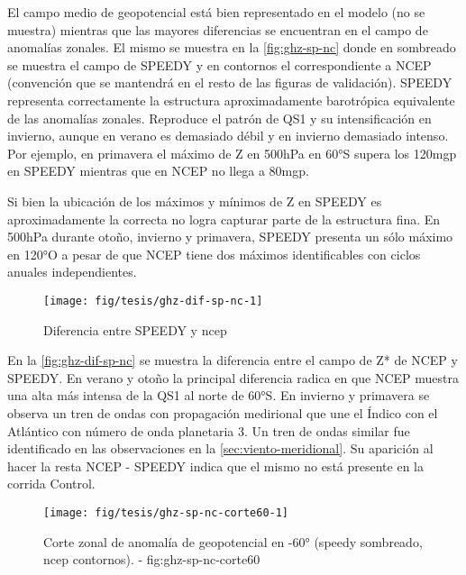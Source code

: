 \documentclass[spanish,a4paper,12p]{book}
\begin{document}
El campo medio de geopotencial está bien representado en el modelo (no
se muestra) mientras que las mayores diferencias se encuentran en el
campo de anomalías zonales. El mismo se muestra en la
\autoref{fig:ghz-sp-nc} donde en sombreado se muestra el campo de SPEEDY
y en contornos el correspondiente a NCEP (convención que se mantendrá en
el resto de las figuras de validación). SPEEDY representa correctamente
la estructura aproximadamente barotrópica equivalente de las anomalías
zonales. Reproduce el patrón de QS1 y su intensificación en invierno,
aunque en verano es demasiado débil y en invierno demasiado intenso. Por
ejemplo, en primavera el máximo de Z en 500hPa en 60°S supera los 120mgp
en SPEEDY mientras que en NCEP no llega a 80mgp.

Si bien la ubicación de los máximos y mínimos de Z en SPEEDY es
aproximadamente la correcta no logra capturar parte de la estructura
fina. En 500hPa durante otoño, invierno y primavera, SPEEDY presenta un
sólo máximo en 120°O a pesar de que NCEP tiene dos máximos
identificables con ciclos anuales independientes.

\begin{landscape}\begin{figure}

{\centering \texttt{[image: fig/tesis/ghz-dif-sp-nc-1]} 

}

\caption{Diferencia entre SPEEDY y ncep}\label{fig:ghz-dif-sp-nc}
\end{figure}
\end{landscape}

En la \autoref{fig:ghz-dif-sp-nc} se muestra la diferencia entre el
campo de Z* de NCEP y SPEEDY. En verano y otoño la principal diferencia
radica en que NCEP muestra una alta más intensa de la QS1 al norte de
60°S. En invierno y primavera se observa un tren de ondas con
propagación medirional que une el Índico con el Atlántico con número de
onda planetaria 3. Un tren de ondas similar fue identificado en las
observaciones en la \autoref{sec:viento-meridional}. Su aparición al
hacer la resta NCEP - SPEEDY indica que el mismo no está presente en la
corrida Control.

\begin{figure}

{\centering \texttt{[image: fig/tesis/ghz-sp-nc-corte60-1]} 

}

\caption{Corte zonal de anomalía de geopotencial en -60° (speedy sombreado, ncep contornos). - fig:ghz-sp-nc-corte60}\label{fig:ghz-sp-nc-corte60}
\end{figure}
\end{document}
